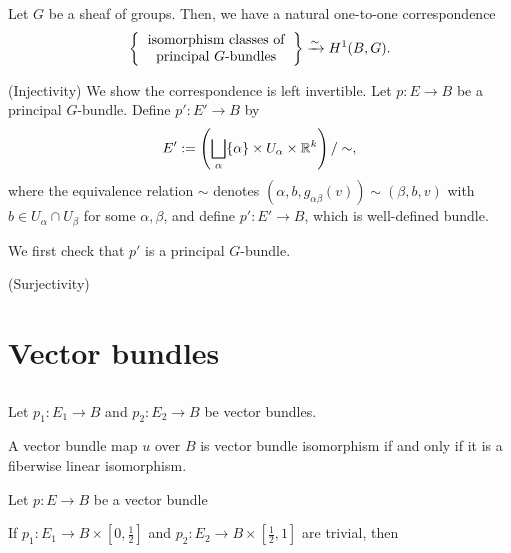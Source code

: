 \documentclass{../../large}
\begin{document}
\begin{prb}
Let $G$ be a sheaf of groups.
Then, we have a natural one-to-one correspondence
\[\left\{\begin{tabular}{c}isomorphism classes of\\principal $G$-bundles\end{tabular}\right\}\xrightarrow{\sim}H^1(B,G).\]
\end{prb}
\begin{pf}
(Injectivity)
We show the correspondence is left invertible.
Let $p:E\to B$ be a principal $G$-bundle.
Define $p':E'\to B$ by
\[E':=\left(\bigsqcup_\alpha\{\alpha\}\times U_\alpha\times\mathbb{R}^k\right)/\sim,\]
where the equivalence relation $\sim$ denotes $(\alpha,b,g_{\alpha\beta}(v))\sim(\beta,b,v)$ with $b\in U_\alpha\cap U_\beta$ for some $\alpha,\beta$, and define $p':E'\to B$, which is well-defined bundle.

We first check that $p'$ is a principal $G$-bundle.

(Surjectivity)
\end{pf}






\chapter{Vector bundles}
\section{}
\begin{prb}

\end{prb}

\begin{prb}
Let $p_1:E_1\to B$ and $p_2:E_2\to B$ be vector bundles.
\begin{parts}
\item A vector bundle map $u$ over $B$ is vector bundle isomorphism if and only if it is a fiberwise linear isomorphism.
\end{parts}
\end{prb}

\begin{prb}
\end{prb}

\begin{prb}
Let $p:E\to B$ be a vector bundle

If $p_1:E_1\to B\times[0,\frac12]$ and $p_2:E_2\to B\times[\frac12,1]$ are trivial, then 
\begin{parts}
\item 
\end{parts}
\end{prb}
\end{document}
